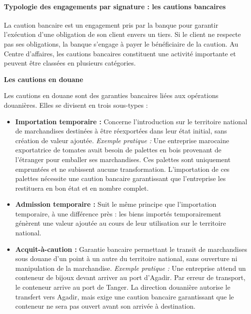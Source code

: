 \documentclass[12pt,a4paper]{report}
\begin{document}
\paragraph{Typologie des engagements par signature : les cautions bancaires}

La caution bancaire est un engagement pris par la banque pour garantir l'exécution d'une obligation de son client envers un tiers. Si le client ne respecte pas ses obligations, la banque s'engage à payer le bénéficiaire de la caution. Au Centre d'affaires, les cautions bancaires constituent une activité importante et peuvent être classées en plusieurs catégories.

\medskip\textbf{Les cautions en douane}

Les cautions en douane sont des garanties bancaires liées aux opérations douanières. Elles se divisent en trois sous-types :

\begin{itemize}
  \item \textbf{Importation temporaire :} Concerne l'introduction sur le territoire national de marchandises destinées à être réexportées dans leur état initial, sans création de valeur ajoutée. \textit{Exemple pratique :} Une entreprise marocaine exportatrice de tomates avait besoin de palettes en bois provenant de l'étranger pour emballer ses marchandises. Ces palettes sont uniquement empruntées et ne subissent aucune transformation. L'importation de ces palettes nécessite une caution bancaire garantissant que l'entreprise les restituera en bon état et en nombre complet.

  \item \textbf{Admission temporaire :} Suit le même principe que l'importation temporaire, à une différence près : les biens importés temporairement génèrent une valeur ajoutée au cours de leur utilisation sur le territoire national.

  \item \textbf{Acquit-à-caution :} Garantie bancaire permettant le transit de marchandises sous douane d'un point à un autre du territoire national, sans ouverture ni manipulation de la marchandise. \textit{Exemple pratique :} Une entreprise attend un conteneur de bijoux devant arriver au port d'Agadir. Par erreur de transport, le conteneur arrive au port de Tanger. La direction douanière autorise le transfert vers Agadir, mais exige une caution bancaire garantissant que le conteneur ne sera pas ouvert avant son arrivée à destination.
\end{itemize}
\end{document}
